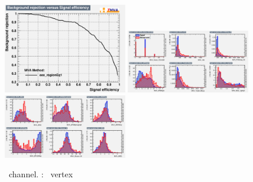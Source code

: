 \begin{figure}[htbp]
	\includegraphics[width=0.48\textwidth]{6_Search/Figures/MVAtechnics/toppairzct/eee/rejBvsS.png}
	\includegraphics[width=0.48\textwidth]{6_Search/Figures/MVAtechnics/toppairzct/eee/variables_id_c1.png}
	\includegraphics[width=0.48\textwidth]{6_Search/Figures/MVAtechnics/toppairzct/eee/variables_id_c2.png}
	\caption{\eee\ channel. \TTSR: \Zct\ vertex }
	\label{image:Figures3etoppairzct}
\end{figure}

